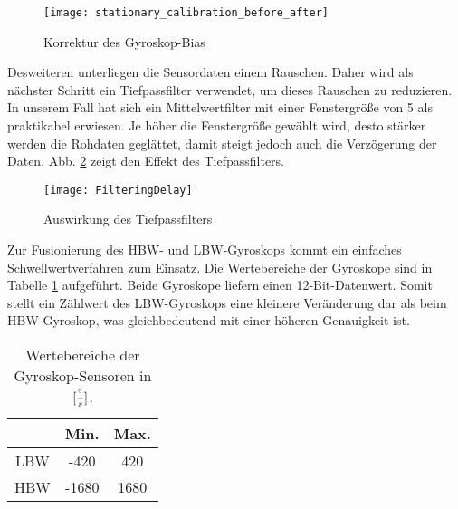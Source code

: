 \begin{figure}
   \centering
   \texttt{[image: stationary\_calibration\_before\_after]}
   \caption{Korrektur des Gyroskop-Bias}
   \label{fig:gyro_bias}
\end{figure}

Desweiteren unterliegen die Sensordaten einem Rauschen. Daher wird als
nächster Schritt ein Tiefpassfilter verwendet, um dieses Rauschen zu
reduzieren. In unserem Fall hat sich ein Mittelwertfilter mit einer 
Fenstergröße von 5 als praktikabel erwiesen. Je höher die Fenstergröße gewählt wird,
desto stärker werden die Rohdaten geglättet, damit steigt jedoch auch
die Verzögerung der Daten. Abb. \ref{fig:lowpass-delay} zeigt den Effekt des Tiefpassfilters.

\begin{figure}
   \centering
   \texttt{[image: FilteringDelay]}
   \caption{Auswirkung des Tiefpassfilters}
   \label{fig:lowpass-delay}
\end{figure}

Zur Fusionierung des HBW- und LBW-Gyroskops kommt ein einfaches
Schwellwertverfahren zum Einsatz. Die Wertebereiche der Gyroskope sind
in Tabelle \ref{tab:ranges-gyros} aufgeführt. Beide Gyroskope liefern
einen 12-Bit-Datenwert. Somit stellt ein Zählwert des LBW-Gyroskops eine
kleinere Veränderung dar als beim HBW-Gyroskop, was gleichbedeutend mit
einer höheren Genauigkeit ist.

\begin{table}[position specifier]
  \centering
  \begin{tabular}{ | c | c | c | }
    \hline
    & Min. & Max. \\ \hline
    LBW & -420   & 420   \\ \hline
    HBW & -1680   & 1680   \\
    \hline
  \end{tabular}
  \caption{Wertebereiche der Gyroskop-Sensoren in $[{\degree \over s}]$.}
  \label{tab:ranges-gyros}
\end{table}


